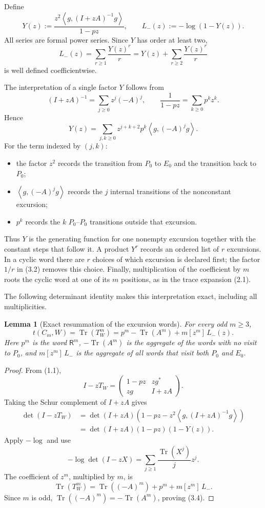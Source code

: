 \documentclass[11pt]{article}
\newtheorem{lemma}[proposition]{Lemma}
\newcommand{\R}{\mathsf R}
\newcommand{\Tr}{\operatorname{Tr}}
\newcommand{\ip}[2]{\left\langle #1,#2\right\rangle}
\newcommand{\coeff}[2]{[z^{#1}]\,#2}
\begin{document}
Define
\[
  Y(z):=
  \frac{z^2\ip{g}{(I+zA)^{-1}g}}{1-pz},
  \qquad
  L_-(z):=-\log(1-Y(z)).
  \tag{3.1}
\]
All series are formal power series.  Since $Y$ has order at least two,
\[
  L_-(z)=\sum_{r\geq1}\frac{Y(z)^r}{r}
  =Y(z)+\sum_{r\geq2}\frac{Y(z)^r}{r}
  \tag{3.2}
\]
is well defined coefficientwise.

The interpretation of a single factor $Y$ follows from
\[
  (I+zA)^{-1}=\sum_{j\geq0}z^j(-A)^j,
  \qquad
  \frac1{1-pz}=\sum_{k\geq0}p^kz^k.
\]
Hence
\[
  Y(z)
  =\sum_{j,k\geq0}
    z^{j+k+2}p^k\ip{g}{(-A)^jg}.
  \tag{3.3}
\]
For the term indexed by $(j,k)$:
\begin{itemize}[leftmargin=2em]
  \item the factor $z^2$ records the transition from $P_0$ to $E_0$ and the
        transition back to $P_0$;
  \item $\ip{g}{(-A)^jg}$ records the $j$ internal transitions of the
        nonconstant excursion;
  \item $p^k$ records the $k$ $P_0$--$P_0$ transitions outside that
        excursion.
\end{itemize}
Thus $Y$ is the generating function for one nonempty excursion together with
the constant steps that follow it.  A product $Y^r$ records an ordered list of
$r$ excursions.  In a cyclic word there are $r$ choices of which excursion
is declared first; the factor $1/r$ in (3.2) removes this choice.  Finally,
multiplication of the coefficient by $m$ roots the cyclic word at one of its
$m$ positions, as in the trace expansion (2.1).

The following determinant identity makes this interpretation exact, including
all multiplicities.

\begin{lemma}[Exact resummation of the excursion words]
For every odd $m\geq3$,
\[
  t(C_m,W)=\Tr(T_W^m)
  =p^m-\Tr(A^m)+m\coeff{m}{L_-(z)}.
  \tag{3.4}
\]
Here $p^m$ is the word $\R^m$, $-\Tr(A^m)$ is the aggregate of the words
with no visit to $P_0$, and $m\coeff{m}{L_-}$ is the aggregate of all words
that visit both $P_0$ and $E_0$.
\end{lemma}

\begin{proof}
From (1.1),
\[
  I-zT_W=
  \begin{pmatrix}
    1-pz & zg^*\\
    zg & I+zA
  \end{pmatrix}.
\]
Taking the Schur complement of $I+zA$ gives
\[
\begin{aligned}
  \det(I-zT_W)
  &=\det(I+zA)
    \left(1-pz-z^2\ip{g}{(I+zA)^{-1}g}\right)\\
  &=\det(I+zA)(1-pz)(1-Y(z)).
\end{aligned}
\]
Apply $-\log$ and use
\[
  -\log\det(I-zX)=\sum_{j\geq1}\frac{\Tr(X^j)}jz^j.
\]
The coefficient of $z^m$, multiplied by $m$, is
\[
  \Tr(T_W^m)=\Tr((-A)^m)+p^m+m\coeff{m}{L_-}.
\]
Since $m$ is odd, $\Tr((-A)^m)=-\Tr(A^m)$, proving (3.4).
\end{proof}
\end{document}
